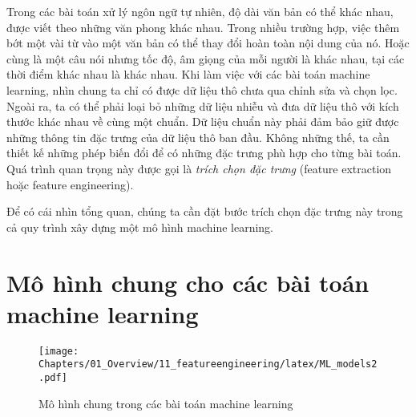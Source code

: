 Trong các bài toán xử lý ngôn ngữ tự nhiên, độ dài văn bản có thể khác nhau, được viết theo những văn phong khác nhau. Trong nhiều trường hợp, việc thêm bớt một vài từ vào một văn bản có thể thay đổi hoàn toàn nội dung của nó. Hoặc
cùng là một câu nói nhưng tốc độ, âm giọng của mỗi người là khác nhau, tại
các thời điểm khác nhau là khác nhau.
Khi làm việc với các bài toán machine learning, nhìn chung ta chỉ có được dữ
liệu thô chưa qua chỉnh sửa và chọn lọc. Ngoài ra, ta có thể phải loại bỏ những
dữ liệu nhiễu và đưa dữ liệu thô với kích thước khác nhau về cùng một chuẩn. Dữ
liệu chuẩn này phải đảm bảo giữ được những thông tin đặc trưng của dữ liệu
thô ban đầu. Không những thế, ta cần thiết kế những phép
biến đổi để có những đặc trưng phù hợp cho từng bài toán. Quá trình quan trọng này được gọi là \textit{trích chọn đặc trưng} ({feature extraction} hoặc {feature engineering}).



Để có cái nhìn tổng quan, chúng ta cần đặt bước trích chọn đặc trưng này trong cả quy trình xây dựng một mô hình machine learning.


\section{Mô hình chung cho các bài toán machine learning }
\begin{figure}[t]
\centering
\texttt{[image: Chapters/01\_Overview/11\_featureengineering/latex/ML\_models2.pdf]}
\caption[]{Mô hình chung trong các bài toán machine learning}
\label{fig:11_1}
\end{figure}


